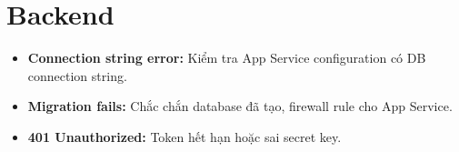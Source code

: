 \documentclass[12pt,a4paper,oneside]{report}
\begin{document}
\section{Backend}

\begin{itemize}[itemsep=2pt]
  \item \textbf{Connection string error:} Kiểm tra App Service configuration có DB connection string.
  \item \textbf{Migration fails:} Chắc chắn database đã tạo, firewall rule cho App Service.
  \item \textbf{401 Unauthorized:} Token hết hạn hoặc sai secret key.
\end{itemize}
\end{document}

